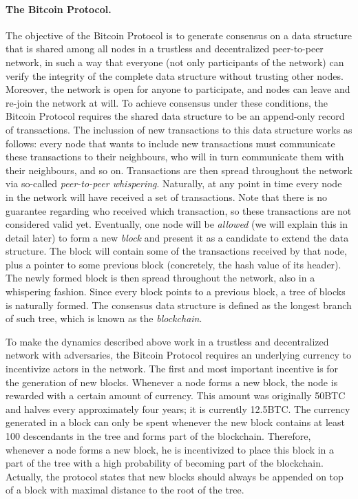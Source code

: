 \paragraph{\bf The Bitcoin Protocol.} The objective of the Bitcoin Protocol is to generate consensus on a data structure that is shared among all nodes in a trustless and decentralized peer-to-peer network, in such a way that everyone (not only participants of the network) can verify the integrity of the complete data structure without trusting other nodes. Moreover, the network is open for anyone to participate, and nodes can leave and re-join the network at will. To achieve consensus under these conditions, the Bitcoin Protocol requires the shared data structure to be an append-only record of transactions. The inclussion of new transactions to this data structure works as follows: every node that wants to include new transactions must communicate these transactions to their neighbours, who will in turn communicate them with their neighbours, and so on. Transactions are then spread throughout the network via so-called \emph{peer-to-peer whispering}. Naturally, at any point in time every node in the network will have received a set of transactions. Note that there is no guarantee regarding who received which transaction, so these transactions are not considered valid yet. Eventually, one node will be \emph{allowed} (we will explain this in detail later) to form a new \emph{block} and present it as a candidate to extend the data structure. The block will contain some of the transactions received by that node, plus a pointer to some previous block (concretely, the hash value of its header). The newly formed block is then spread throughout the network, also in a whispering fashion. Since every block points to a previous block, a tree of blocks is naturally formed. The consensus data structure is defined as the longest branch of such tree, which is known as the \emph{blockchain}.

To make the dynamics described above work in a trustless and decentralized network with adversaries, the Bitcoin Protocol requires an underlying currency to incentivize actors in the network. The first and most important incentive is for the generation of new blocks. Whenever a node forms a new block, the node is rewarded with a certain amount of currency. This amount was originally 50BTC and halves every approximately four years; it is currently 12.5BTC. The currency generated in a block can only be spent whenever the new block contains at least 100 descendants in the tree and forms part of the blockchain. Therefore, whenever a node forms a new block, he is incentivized to place this block in a part of the tree with a high probability of becoming part of the blockchain. Actually, the protocol states that new blocks should always be appended on top of a block with maximal distance to the root of the tree.

